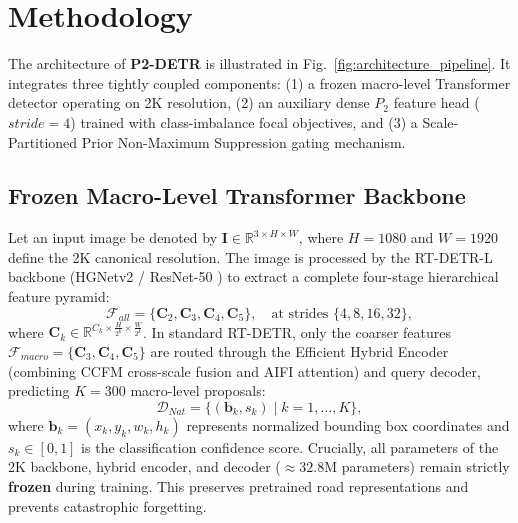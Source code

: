 \documentclass[runningheads]{llncs}
\begin{document}
\section{Methodology}

The architecture of \textbf{P2-DETR} is illustrated in Fig.~\ref{fig:architecture_pipeline}. It integrates three tightly coupled components: (1) a frozen macro-level Transformer detector operating on 2K resolution, (2) an auxiliary dense $P_2$ feature head ($stride=4$) trained with class-imbalance focal objectives, and (3) a Scale-Partitioned Prior Non-Maximum Suppression gating mechanism.

\subsection{Frozen Macro-Level Transformer Backbone}
Let an input image be denoted by $\mathbf{I} \in \mathbb{R}^{3 \times H \times W}$, where $H=1080$ and $W=1920$ define the 2K canonical resolution. The image is processed by the RT-DETR-L backbone (HGNetv2 / ResNet-50 \cite{he2016deep}) to extract a complete four-stage hierarchical feature pyramid:
\begin{equation}
    \mathcal{F}_{all} = \{ \mathbf{C}_2, \mathbf{C}_3, \mathbf{C}_4, \mathbf{C}_5 \}, \quad \text{at strides } \{ 4, 8, 16, 32 \},
\end{equation}
where $\mathbf{C}_k \in \mathbb{R}^{C_k \times \frac{H}{2^k} \times \frac{W}{2^k}}$. In standard RT-DETR, only the coarser features $\mathcal{F}_{macro} = \{ \mathbf{C}_3, \mathbf{C}_4, \mathbf{C}_5 \}$ are routed through the Efficient Hybrid Encoder (combining CCFM cross-scale fusion and AIFI attention) and query decoder, predicting $K=300$ macro-level proposals:
\begin{equation}
    \mathcal{D}_{Nat} = \big\{ (\mathbf{b}_k, s_k) \mid k = 1, \dots, K \big\},
\end{equation}
where $\mathbf{b}_k = (x_k, y_k, w_k, h_k)$ represents normalized bounding box coordinates and $s_k \in [0, 1]$ is the classification confidence score. Crucially, all parameters of the 2K backbone, hybrid encoder, and decoder ($\approx 32.8\text{M}$ parameters) remain strictly \textbf{frozen} during training. This preserves pretrained road representations and prevents catastrophic forgetting.
\end{document}
